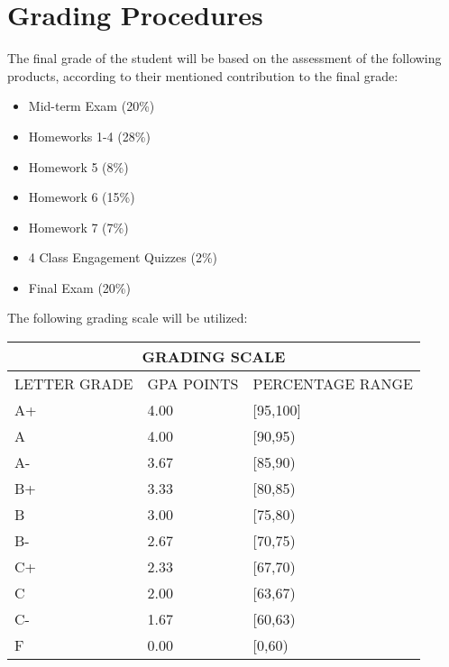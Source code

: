\documentclass[a4paper]{article}
\begin{document}
\section{Grading Procedures}


The final grade of the student will be based on the assessment of the following products, according to their mentioned contribution to the final grade:
\begin{itemize}
	\item Mid-term Exam (20\%) 	
	\item Homeworks 1-4 (28\%)
	\item Homework 5 (8\%)
	\item Homework 6 (15\%)
	\item Homework 7 (7\%)
	\item 4 Class Engagement Quizzes (2\%)
	\item Final Exam (20\%)
\end{itemize}

The following grading scale will be utilized:
\begin{table}[h!]
	\centering
	\begin{tabular}{|l|l|l|}
		\hline
		\multicolumn{3}{c}{GRADING SCALE}\\
		\hline 
		LETTER GRADE & GPA POINTS & PERCENTAGE RANGE \\
		\hline
		A+ & 4.00 & [95,100] \\
		\hline
		A & 4.00 & [90,95) \\
		\hline
		A- & 3.67 & [85,90) \\
		\hline
		B+ & 3.33 & [80,85) \\
		\hline
		B & 3.00 & [75,80) \\
		\hline
		B- & 2.67 & [70,75) \\
		\hline
		C+ & 2.33 & [67,70) \\
		\hline
		C & 2.00 & [63,67) \\
		\hline
		C- & 1.67 & [60,63) \\
		\hline
		F & 0.00 & [0,60) \\
		\hline
	\end{tabular}
\end{table}
\end{document}
